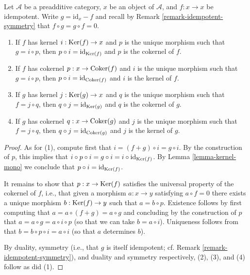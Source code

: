 \begin{lemma}
\label{lemma-idempotent-kernel-cokernel}
Let $\mathcal{A}$ be a preadditive category,
$x$ be an object of $\mathcal{A}$,
and $f : x \to x$ be idempotent.
Write $g = \text{id} _ x - f$
and recall by Remark \ref{remark-idempotent-symmetry}
that $f \circ g = g \circ f = 0$.
\begin{enumerate}
\item If $f$ has kernel $i : \mathop{\mathrm{Ker}} (f) \to x$
and $p$ is the unique morphism such that $g = i \circ p$,
then $p \circ i = \text{id} _ {\mathop{\mathrm{Ker}} (f)}$
and $p$ is the cokernel of $f$.
\item If $f$ has cokernel $p : x \to \mathop{\mathrm{Coker}} (f)$
and $i$ is the unique morphism such that $g = i \circ p$,
then $p \circ i = \text{id} _ {\mathop{\mathrm{Coker}} (f)}$
and $i$ is the kernel of $f$.
\item If $g$ has kernel $j : \mathop{\mathrm{Ker}} (g) \to x$
and $q$ is the unique morphism such that $f = j \circ q$,
then $q \circ j = \text{id} _ {\mathop{\mathrm{Ker}} (g)}$
and $q$ is the cokernel of $g$.
\item If $g$ has cokernel $q : x \to \mathop{\mathrm{Coker}} (g)$
and $j$ is the unique morphism such that $f = j \circ q$,
then $q \circ j = \text{id} _ {\mathop{\mathrm{Coker}} (g)}$
and $j$ is the kernel of $g$.
\end{enumerate}
\end{lemma}

\begin{proof}
As for (1), compute first that $i = (f + g) \circ i = g \circ i$.
By the construction of $p$, this implies that
$i \circ p \circ i = g \circ i = i \circ \text{id} _ {\mathop{\mathrm{Ker}} (f)}$.
By Lemma \ref{lemma-kernel-mono} we conclude that
$p \circ i = \text{id} _ {\mathop{\mathrm{Ker}} (f)}$.

\medskip\noindent
It remains to show that $p : x \to \mathop{\mathrm{Ker}} (f)$
satisfies the universal property of the cokernel of $f$,
i.e., that given a morphism $a : x \to y$ satisfying $a \circ f = 0$
there exists a unique morphism $b : \mathop{\mathrm{Ker}} (f) \to y$
such that $a = b \circ p$.
Existence follows by first computing that $a = a \circ (f + g) = a \circ g$
and concluding by the construction of $p$
that $a = a \circ g = a \circ i \circ p$
(so that we can take $b = a \circ i$).
Uniqueness follows from that $b = b \circ p \circ i = a \circ i$
(so that $a$ determines $b$).

\medskip\noindent
By duality,
symmetry (i.e., that $g$ is itself idempotent;
cf. Remark \ref{remark-idempotent-symmetry}),
and duality and symmetry respectively, (2), (3), and (4) follow as did (1).
\end{proof}

